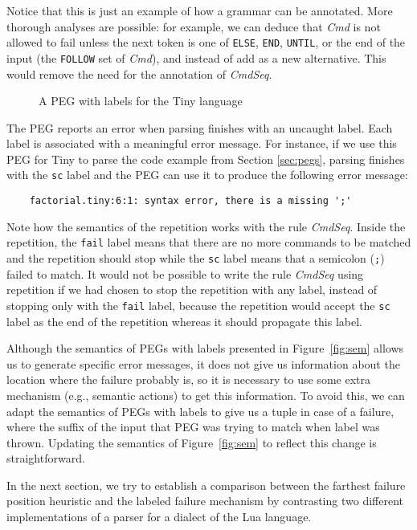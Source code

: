 \documentclass[3p,12pt,singlecolumn]{elsarticle}
\begin{document}
Notice that this is just an example of how a grammar can be
annotated. More thorough analyses are possible: for example,
we can deduce that {\it Cmd} is not allowed to fail unless
the next token is one of {\tt ELSE}, {\tt END}, {\tt UNTIL},
or the end of the input (the {\tt FOLLOW} set of {\it Cmd}), and instead of  add  as a new alternative. This would
remove the need for the  annotation of {\it CmdSeq}.

\begin{figure}

\caption{A PEG with labels for the Tiny language}
\label{fig:tinylabels}
\end{figure}

The PEG reports an error when parsing finishes with an
uncaught label. Each label is associated with a
meaningful error message.
For instance, if we use this PEG for Tiny to parse the
code example from Section \ref{sec:pegs}, parsing finishes with the
\texttt{sc} label and the PEG can use it to produce the following
error message:

\begin{verbatim}
    factorial.tiny:6:1: syntax error, there is a missing ';'
\end{verbatim}

Note how the semantics of the repetition works with the rule
\textit{CmdSeq}.
Inside the repetition, the \texttt{fail} label means that there are no
more commands to be matched and the repetition should stop while the
\texttt{sc} label means that a semicolon (\texttt{;}) failed to match.
It would not be possible to write the rule \textit{CmdSeq}
using repetition if we had chosen to stop the repetition with any
label, instead of stopping only with the \texttt{fail} label,
because the repetition would accept the \texttt{sc} label as the
end of the repetition whereas it should propagate this label.


Although the semantics of PEGs with labels presented in
Figure~\ref{fig:sem} allows us to generate specific error
messages, it does not give us information about the location
where the failure probably is, so it is necessary to use some
extra mechanism (e.g., semantic actions) to get this information.
To avoid this, we can adapt the semantics of PEGs with labels
to give us a tuple  in case of a failure, where
 the suffix of the input that PEG was trying to match
when label  was thrown. Updating the semantics of Figure~\ref{fig:sem}
to reflect this change is straightforward.

In the next section, we try to establish a comparison between
the farthest failure position heuristic and the labeled failure mechanism
by contrasting two different implementations of a parser for a dialect of
the Lua language.
\end{document}
